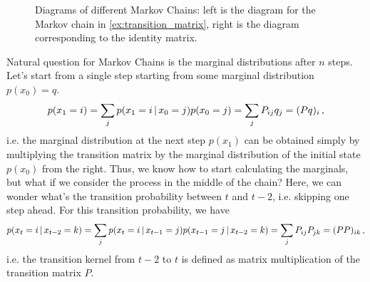 \begin{figure}[t]
    \centering
    \caption{Diagrams of different Markov Chains: left is the diagram for the Markov chain in \cref{ex:transition_matrix}, right is the diagram corresponding to the identity matrix.}
    \label{fig:transition_matrix}
\end{figure}

Natural question for Markov Chains is the marginal distributions after $n$ steps. Let's start from a single step starting from some marginal distribution $p(x_0) = q$.
\begin{align}
    p(x_1 = i) = \sum_j p(x_1 = i \,|\, x_0=j)p(x_0=j) = \sum_j P_{ij}q_j = (Pq)_i\,,
\end{align}
i.e. the marginal distribution at the next step $p(x_1)$ can be obtained simply by multiplying the transition matrix by the marginal distribution of the initial state $p(x_0)$ from the right. Thus, we know how to start calculating the marginals, but what if we consider the process in the middle of the chain? Here, we can wonder what's the transition probability between $t$ and $t-2$, i.e. skipping one step ahead. For this transition probability, we have
\begin{align}
    p(x_t=i\,|\, x_{t-2}=k) = \sum_j p(x_t=i\,|\, x_{t-1}=j) p(x_{t-1}=j\,|\, x_{t-2}=k) = \sum_j P_{ij} P_{jk} = (PP)_{ik}\,,
\end{align}
i.e. the transition kernel  from $t-2$ to $t$ is defined as matrix multiplication of the transition matrix $P$. 

